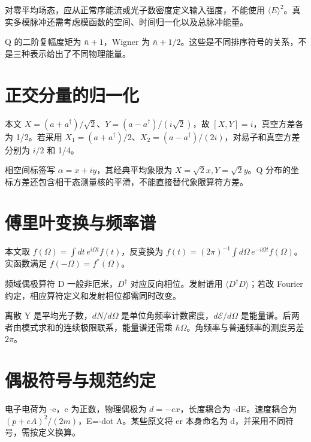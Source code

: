 \documentclass[UTF8,a4paper,zihao=-4,openany,fontset=fandol]{ctexbook}
\begin{document}
对零平均场态，应从正常序能流或光子数密度定义输入强度，不能使用 $\langle E\rangle^2$。真实多模脉冲还需考虑模函数的空间、时间归一化以及总脉冲能量。



Q 的二阶复幅度矩为 $\bar n+1$，Wigner 为 $\bar n+1/2$。这些是不同排序符号的关系，不是三种表示给出了不同物理能量。



\section{正交分量的归一化}\label{sec:C:3}


本文 $X=(a+a^\dagger)/\sqrt2$、$Y=(a-a^\dagger)/(i\sqrt2)$，故 $[X,Y]=i$，真空方差各为 1/2。若采用 $X_1=(a+a^\dagger)/2$、$X_2=(a-a^\dagger)/(2i)$，对易子和真空方差分别为 $i/2$ 和 1/4。



相空间标签写 $\alpha=x+iy$，其经典平均象限为 $X=\sqrt2x,Y=\sqrt2y$。Q 分布的坐标方差还包含相干态测量核的平滑，不能直接替代象限算符方差。



\section{傅里叶变换与频率谱}\label{sec:C:4}


本文取 $f(\Omega)=\int dt\,e^{i\Omega t}f(t)$，反变换为 $f(t)=(2\pi)^{-1}\int d\Omega\,e^{-i\Omega t}f(\Omega)$。实函数满足 $f(-\Omega)=f^*(\Omega)$。



频域偶极算符 D 一般非厄米，$D^\dagger$ 对应反向相位。发射谱用 $\langle D^\dagger D\rangle$；若改 Fourier 约定，相应算符定义和发射相位都需同时改变。



离散 Y 是平均光子数，$dN/d\Omega$ 是单位角频率计数密度，$d\mathcal E/d\Omega$ 是能量谱。后两者由模式求和的连续极限联系，能量谱还需乘 $\hbar\Omega$。角频率与普通频率的测度另差 $2\pi$。



\section{偶极符号与规范约定}\label{sec:C:5}


电子电荷为 -e，e 为正数，物理偶极为 $d=-ex$，长度耦合为 -dE。速度耦合为 $(p+eA)^2/(2m)$，E=-dot A。某些原文将 er 本身命名为 d，并采用不同符号，需按定义换算。
\end{document}
